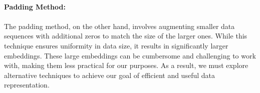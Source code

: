         \paragraph{Padding Method:}
        \paragraph{}The padding method, on the other hand, involves augmenting smaller data sequences with additional zeros to match the size of the larger ones. While this technique ensures uniformity in data size, it results in significantly larger embeddings. These large embeddings can be cumbersome and challenging to work with, making them less practical for our purposes. As a result, we must explore alternative techniques to achieve our goal of efficient and useful data representation.